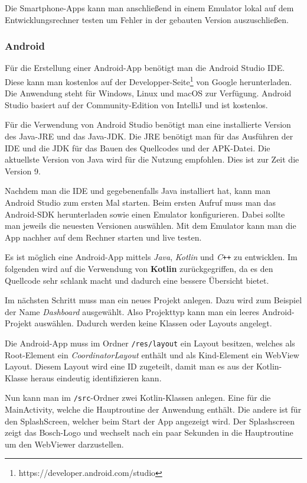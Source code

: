 Die Smartphone-Apps kann man anschließend in einem Emulator lokal auf dem Entwicklungsrechner testen um Fehler in der
gebauten Version auszuschließen.

\subsubsection{Android}
Für die Erstellung einer Android-App benötigt man die Android Studio IDE. Diese kann man kostenlos auf der
Developper-Seite\footnote{https://developer.android.com/studio} von Google herunterladen. Die Anwendung steht für
Windows, Linux und macOS zur Verfügung. Android Studio basiert auf der Community-Edition von IntelliJ und ist kostenlos.

Für die Verwendung von Android Studio benötigt man eine installierte Version des Java-JRE und das Java-JDK. Die JRE
benötigt man für das Ausführen der IDE und die JDK für das Bauen des Quellcodes und der APK-Datei. Die aktuellste
Version von Java wird für die Nutzung empfohlen. Dies ist zur Zeit die Version 9.

Nachdem man die IDE und gegebenenfalls Java installiert hat, kann man Android Studio zum ersten Mal starten. Beim ersten
Aufruf muss man das Android-SDK herunterladen sowie einen Emulator konfigurieren. Dabei sollte man jeweils die neuesten
Versionen auswählen. Mit dem Emulator kann man die App nachher auf dem Rechner starten und live testen.

Es ist möglich eine Android-App mittels \textit{Java}, \textit{Kotlin} und \textit{C\texttt{++}} zu entwicklen. Im
folgenden wird auf die Verwendung von \textbf{Kotlin} zurückgegriffen, da es den Quellcode sehr schlank macht und
dadurch eine bessere Übersicht bietet.

Im nächsten Schritt muss man ein neues Projekt anlegen. Dazu wird zum Beispiel der Name \textit{Dashboard} ausgewählt.
Also Projekttyp kann man ein leeres Android-Projekt auswählen. Dadurch werden keine Klassen oder Layouts angelegt.

Die Android-App muss im Ordner \texttt{/res/layout} ein Layout besitzen, welches als Root-Element ein
\textit{CoordinatorLayout} enthält und als Kind-Element ein WebView Layout. Diesem Layout wird eine ID zugeteilt, damit
man es aus der Kotlin-Klasse heraus eindeutig identifizieren kann.

Nun kann man im \texttt{/src}-Ordner zwei Kotlin-Klassen anlegen. Eine für die MainActivity, welche die Hauptroutine der
Anwendung enthält. Die andere ist für den SplashScreen, welcher beim Start der App angezeigt wird. Der Splashscreen
zeigt das Bosch-Logo und wechselt nach ein paar Sekunden in die Hauptroutine um den WebViewer darzustellen.

